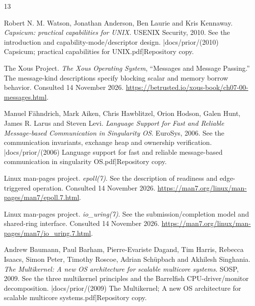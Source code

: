 \renewcommand{\bibname}{Sources for Architectural Comparisons}
\begin{thebibliography}{13}
\setlength{\itemsep}{0.25\baselineskip}
\setlength{\parsep}{0pt}

Robert N. M. Watson, Jonathan Anderson, Ben Laurie and Kris Kennaway.
\emph{Capsicum: practical capabilities for UNIX}. USENIX Security, 2010.
See the introduction and capability-mode/descriptor design.
\repofiletext|docs/prior/(2010) Capsicum; practical capabilities for UNIX.pdf|{Repository copy.}

The Xous Project. \emph{The Xous Operating System}, ``Messages and Message
Passing.'' The message-kind descriptions specify blocking scalar and memory
borrow behavior. Consulted 14 November 2026.
\url{https://betrusted.io/xous-book/ch07-00-messages.html}.

Manuel F\"ahndrich, Mark Aiken, Chris Hawblitzel, Orion Hodson, Galen Hunt,
James R. Larus and Steven Levi.
\emph{Language Support for Fast and Reliable Message-based Communication in
Singularity OS}. EuroSys, 2006. See the communication invariants, exchange
heap and ownership verification.
\repofiletext|docs/prior/(2006) Language support for fast and reliable message-based communication in singularity OS.pdf|{Repository copy.}

Linux man-pages project. \emph{epoll(7)}. See the description of readiness
and edge-triggered operation. Consulted 14 November 2026.
\url{https://man7.org/linux/man-pages/man7/epoll.7.html}.

Linux man-pages project. \emph{io\_uring(7)}. See the submission/completion
model and shared-ring interface. Consulted 14 November 2026.
\url{https://man7.org/linux/man-pages/man7/io_uring.7.html}.

Andrew Baumann, Paul Barham, Pierre-Evariste Dagand, Tim Harris,
Rebecca Isaacs, Simon Peter, Timothy Roscoe, Adrian Sch\"upbach and
Akhilesh Singhania.
\emph{The Multikernel: A new OS architecture for scalable multicore systems}.
SOSP, 2009. See the three multikernel principles and the Barrelfish
CPU-driver/monitor decomposition.
\repofiletext|docs/prior/(2009) The Multikernel; A new OS architecture for scalable multicore systems.pdf|{Repository copy.}


\end{thebibliography}

